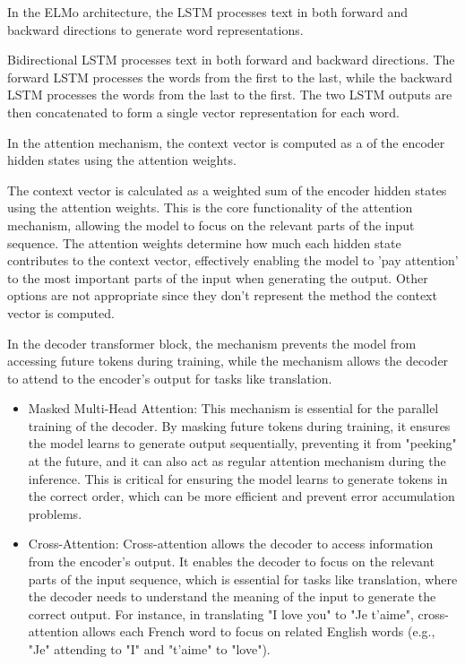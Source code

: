 \documentclass[11pt,addpoints,answers]{exam}
\begin{document}
\begin{questions}
\question[1] In the ELMo architecture, the \fillin[bidirectional] LSTM processes text in both forward and backward directions to generate word representations.
\begin{solution}
Bidirectional LSTM processes text in both forward and backward directions. The forward LSTM processes the words from the first to the last, while the backward LSTM processes the words from the last to the first. The two LSTM outputs are then concatenated to form a single vector representation for each word.
\end{solution}

\question[1] In the attention mechanism, the context vector is computed as a  of the encoder hidden states using the attention weights.
\begin{solution}
The context vector is calculated as a weighted sum of the encoder hidden states using the attention weights. This is the core functionality of the attention mechanism, allowing the model to focus on the relevant parts of the input sequence. The attention weights determine how much each hidden state contributes to the context vector, effectively enabling the model to 'pay attention' to the most important parts of the input when generating the output. Other options are not appropriate since they don't represent the method the context vector is computed.
\end{solution}

\question[2] In the decoder transformer block, the  mechanism prevents the model from accessing future tokens during training, while the  mechanism allows the decoder to attend to the encoder's output for tasks like translation.
\begin{solution}
  \begin{itemize}
    \item Masked Multi-Head Attention: This mechanism is essential for the parallel training of the decoder. By masking future tokens during training, it ensures the model learns to generate output sequentially, preventing it from "peeking" at the future, and it can also act as regular attention mechanism during the inference. This is critical for ensuring the model learns to generate tokens in the correct order, which can be more efficient and prevent error accumulation problems.
    \item Cross-Attention: Cross-attention allows the decoder to access information from the encoder's output. It enables the decoder to focus on the relevant parts of the input sequence, which is essential for tasks like translation, where the decoder needs to understand the meaning of the input to generate the correct output. For instance, in translating "I love you" to "Je t'aime", cross-attention allows each French word to focus on related English words (e.g., "Je" attending to "I" and "t'aime" to "love").
  \end{itemize}
\end{solution}


\end{questions}
\end{document}
